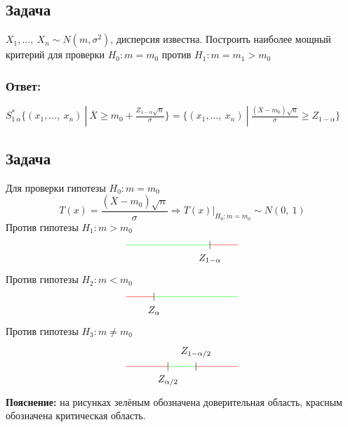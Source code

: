 \documentclass[12pt, a4paper]{article}
\begin{document}
\subsection*{Задача}
$X_1,\dots,\ X_n \sim N(m, \sigma^2)$, дисперсия известна. Построить наиболее мощный критерий для проверки $H_0: m = m_0$ против $H_1: m = m_1 > m_0$
\subsubsection*{Ответ:}
$S^*_{1\, \alpha} \{(x_1,\dots,\ x_n)\ | \ \overline{X} \geq m_0 + \frac{Z_{1 - \alpha}\sqrt{n}}{\sigma}\} = \{(x_1,\dots,\ x_n)\ |\ \frac{(\overline{X} - m_0)\sqrt{n}}{\sigma} \geq Z_{1 - \alpha}\}$
\subsection*{Задача}
Для проверки гипотезы $H_0: m = m_0$
\[T(x) = \frac{(\overline{X} - m_0)\sqrt{n}}{\sigma}\Rightarrow T(x)\big|_{H_0: m = m_0} \sim N(0,\ 1)\]
Против гипотезы $H_1: m > m_0$
\[\begin{tikzpicture}
    \draw[color=green] (-2, 0) -- (1, 0);
    \draw[color=red] (1, 0) -- (2, 0);
    \draw (1, 0.15) -- (1, -0.15);
    \node at (1, -0.5) (a) {$Z_{1 - \alpha}$};
\end{tikzpicture}\]
Против гипотезы $H_2: m < m_0$
\[\begin{tikzpicture}
    \draw[color=green] (-1, 0) -- (2, 0);
    \draw[color=red] (-2, 0) -- (-1, 0);
    \draw (-1, -0.15) -- (-1, 0.15);
    \node at (-1, -0.5) (a) {$Z_{\alpha}$};
\end{tikzpicture}\]
Против гипотезы $H_3: m \neq m_0$
\[\begin{tikzpicture}
    \draw[color=red] (-2, 0) -- (-0.5, 0);
    \draw[color=red] (0.5, 0) -- (2, 0);
    \draw[color=green] (-0.5, 0) -- (0.5, 0);
    \draw (0.5, -0.15) -- (0.5, 0.15);
    \draw (-0.5, -0.15) -- (-0.5, 0.15);
    \node at(-0.5, -0.5) (a) {$Z_{\alpha/2}$};
    \node at(0.5, 0.5) (a) {$Z_{1 - \alpha/2}$};
\end{tikzpicture}\]
\textbf{Пояснение:} на рисунках зелёным обозначена доверительная область, красным обозначена критическая область.
\end{document}
